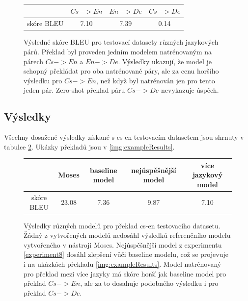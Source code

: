 \begin{figure}[H]
    \begin{center}
        \begin{tabular}{c|c|c|c}
          & $Cs->En$ & $En->De$ & $Cs->De$ \\
          \hline
          skóre BLEU & 7.10 & 7.39 & 0.14 \\
          \hline
        \end{tabular}
    \end{center}
	\caption{Výsledné skóre BLEU pro testovací datasety různých jazykových párů. Překlad byl proveden jedním modelem natrénovaným na párech $Cs->En$ a $En->De$. Výsledky ukazují, že model je schopný překládat pro oba natrénované páry, ale za cenu horšího výsledku pro $Cs->En$, než když byl natrénován jen pro tento jeden pár. Zero-shot překlad páru $Cs->De$ nevykazuje úspěch.}
	\label{table:resultsMulti}
\end{figure}

\subsection{Výsledky}
Všechny dosažené výsledky získané s cs-en testovacím datasetem jsou shrnuty v tabulce \ref{table:results}. Ukázky překladů jsou v \ref{img:exampleResults}.

\begin{figure}[H]
    \begin{center}
        \begin{tabular}{c|c|c|c|c}
           & Moses & baseline model & nejúspěšnější model & více jazykový model \\
          \hline
          skóre BLEU & 23.08 & 7.36 & 9.87 & 7.10 \\
          \hline
        \end{tabular}
    \end{center}
	\caption{Výsledky různých modelů pro překlad cs-en testovacího datasetu. Žádný z vytvořených modelů nedosáhl výsledků referenčního modelu vytvořeného v nástroji Moses. Nejúspěšnější model z experimentu \ref{experiment8} dosáhl zlepšení vůči baseline modelu, což se projevuje i na ukázkách překladu \ref{img:exampleResults}. Model natrénovaný pro překlad mezi více jazyky má skóre horší jak baseline model pro překlad $Cs->En$, ale za to dosahuje podobného výsledku i pro překlad $Cs->De$.}
	\label{table:results}
\end{figure}


